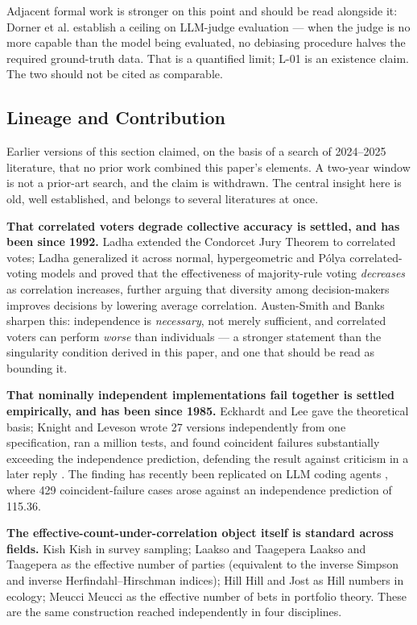 \documentclass[11pt,a4paper]{article}
\theoremstyle{definition}
\theoremstyle{remark}
\begin{document}
Adjacent formal work is stronger on this point and should be read alongside it: Dorner et al. \cite{dorner2025} establish a ceiling on LLM-judge evaluation --- when the judge is no more capable than the model being evaluated, no debiasing procedure halves the required ground-truth data. That is a quantified limit; L-01 is an existence claim. The two should not be cited as comparable.

\subsection{Lineage and Contribution}

Earlier versions of this section claimed, on the basis of a search of 2024--2025 literature,
that no prior work combined this paper's elements. A two-year window is not a prior-art search,
and the claim is withdrawn. The central insight here is old, well established, and belongs to
several literatures at once.

\textbf{That correlated voters degrade collective accuracy is settled, and has been since 1992.}
Ladha \cite{ladha1992} extended the Condorcet Jury Theorem to correlated votes;
Ladha \cite{ladha1995} generalized it across normal, hypergeometric and P\'olya correlated-voting
models and proved that the effectiveness of majority-rule voting \emph{decreases} as
correlation increases, further arguing that diversity among decision-makers improves decisions
by lowering average correlation. Austen-Smith and Banks \cite{austensmith1996} sharpen this: independence is
\emph{necessary}, not merely sufficient, and correlated voters can perform \emph{worse} than
individuals --- a stronger statement than the singularity condition derived in this paper, and
one that should be read as bounding it.

\textbf{That nominally independent implementations fail together is settled empirically, and
has been since 1985.} Eckhardt and Lee \cite{eckhardt1985} gave the theoretical basis;
Knight and Leveson \cite{knight1986} wrote 27 versions independently from one specification, ran a million tests,
and found coincident failures substantially exceeding the independence prediction, defending
the result against criticism in a later reply \cite{knight1990}. The finding has recently been replicated on
LLM coding agents \cite{nversion2026}, where 429 coincident-failure cases arose against an
independence prediction of 115.36.

\textbf{The effective-count-under-correlation object itself is standard across fields.}
Kish Kish \cite{kish1965} in survey sampling; Laakso and Taagepera Laakso and Taagepera \cite{laakso1979} as the effective number of parties
(equivalent to the inverse Simpson and inverse Herfindahl--Hirschman indices);
Hill Hill \cite{hill1973} and Jost \cite{jost2006} as Hill numbers in ecology; Meucci Meucci \cite{meucci2010} as the
effective number of bets in portfolio theory. These are the same construction reached
independently in four disciplines.
\end{document}
